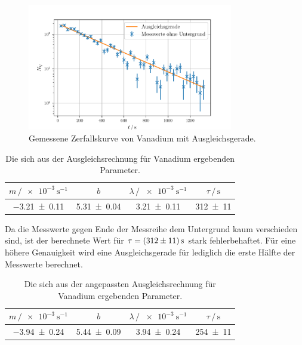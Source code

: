 \begin{figure}
    \centering
    \includegraphics[width=0.8\textwidth]{plots/Vanadium_Ausgleich.pdf}
    \caption{Gemessene Zerfallskurve von Vanadium mit Ausgleichsgerade.}
    \label{fig:VanadiumMess}
\end{figure}

\begin{table}
    \centering
    \caption{Die sich aus der Ausgleichsrechnung für Vanadium ergebenden Parameter.}
    \label{tab:paramsVanadium}
    \begin{tabular}{c c c c}
        \toprule
        $m\,/\SI{e-3}{\second\tothe{-1}}$ & $b$ & $\lambda\,/\,\SI{e-3}{\second\tothe{-1}}$ & $\tau\,/\,\si{\second}$ \\
        \midrule
        \num{-3.21+-0.11} & \num{5.31+-0.04} & \num{3.21+-0.11} & \num{312+-11} \\
        \bottomrule
    \end{tabular}
\end{table}

Da die Messwerte gegen Ende der Messreihe dem Untergrund kaum verschieden sind, ist der berechnete Wert für $\tau = \SI{312\pm11}{\second}$ stark fehlerbehaftet.
Für eine höhere Genauigkeit wird eine Ausgleichsgerade für lediglich die erste Hälfte der Messwerte berechnet.

\begin{table}
    \centering
    \caption{Die sich aus der angepassten Ausgleichsrechnung für Vanadium ergebenden Parameter.}
    \label{tab:paramsVanadiumNeu}
    \begin{tabular}{c c c c}
        \toprule
        $m\,/\SI{e-3}{\second\tothe{-1}}$ & $b$ & $\lambda\,/\,\SI{e-3}{\second\tothe{-1}}$ & $\tau\,/\,\si{\second}$ \\
        \midrule
        \num{-3.94+-0.24} & \num{5.44+-0.09} & \num{3.94+-0.24} & \num{254+-11} \\
        \bottomrule
    \end{tabular}
\end{table}

